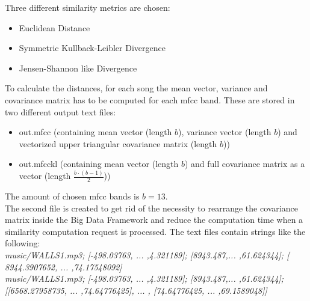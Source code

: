Three different similarity metrics are chosen: 
\begin{itemize}
	\item Euclidean Distance
	\item Symmetric Kullback-Leibler Divergence
	\item Jensen-Shannon like Divergence
\end{itemize}
To calculate the distances, for each song the mean vector, variance and covariance matrix has to be computed for each mfcc band. These are stored in two different output text files: 
\begin{itemize}
	\item out.mfcc (containing mean vector (length $b$), variance vector (length $b$) and vectorized upper triangular covariance matrix (length $b$))
	\item out.mfcckl (containing mean vector (length $b$) and full covariance matrix as a vector (length $\frac{b \cdot (b-1)}{2}$))
\end{itemize}
The amount of chosen mfcc bands is $b = 13$.\\
The second file is created to get rid of the necessity to rearrange the covariance matrix inside the Big Data Framework and reduce the computation time when a similarity computation request is processed.
The text files contain strings like the following:\\
\textit{music/WALLS1.mp3; [-498.03763,  ... ,4.321189]; [8943.487,... ,61.624344]; [ 8944.3907652, ... ,74.17548092]}\\
\textit{music/WALLS1.mp3; [-498.03763,  ... ,4.321189]; [8943.487,... ,61.624344]; [[6568.27958735, ... ,74.64776425], ... , [74.64776425, ... ,69.1589048]]}